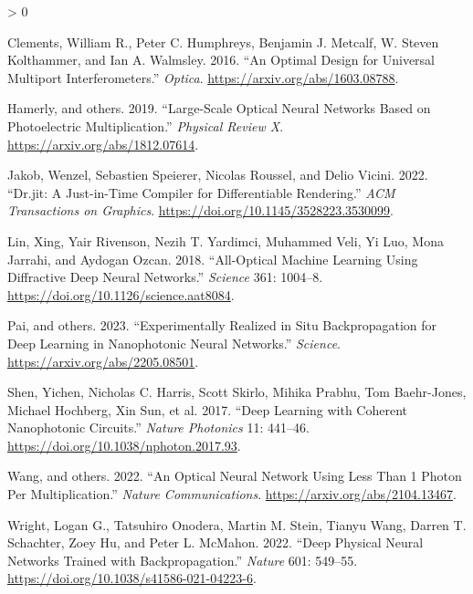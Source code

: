 \documentclass[
  10pt,
]{article}
\newlength{\cslhangindent}
\newenvironment{CSLReferences}[2] %
 {%
  \setlength{\parindent}{0pt}
  \ifodd #1 \everypar{\setlength{\hangindent}{\cslhangindent}}\ignorespaces\fi
  \ifnum #2 > 0
  \setlength{\parskip}{#2\baselineskip}
  \fi
 }%
 {}
\begin{document}
\hypertarget{refs}{}
\begin{CSLReferences}{1}{0}
\leavevmode{}%
Clements, William R., Peter C. Humphreys, Benjamin J. Metcalf, W. Steven
Kolthammer, and Ian A. Walmsley. 2016. {``An Optimal Design for
Universal Multiport Interferometers.''} \emph{Optica}.
\url{https://arxiv.org/abs/1603.08788}.

\leavevmode{}%
Hamerly, and others. 2019. {``Large-Scale Optical Neural Networks Based
on Photoelectric Multiplication.''} \emph{Physical Review X}.
\url{https://arxiv.org/abs/1812.07614}.

\leavevmode{}%
Jakob, Wenzel, Sebastien Speierer, Nicolas Roussel, and Delio Vicini.
2022. {``Dr.jit: A Just-in-Time Compiler for Differentiable
Rendering.''} \emph{ACM Transactions on Graphics}.
\url{https://doi.org/10.1145/3528223.3530099}.

\leavevmode{}%
Lin, Xing, Yair Rivenson, Nezih T. Yardimci, Muhammed Veli, Yi Luo, Mona
Jarrahi, and Aydogan Ozcan. 2018. {``All-Optical Machine Learning Using
Diffractive Deep Neural Networks.''} \emph{Science} 361: 1004--8.
\url{https://doi.org/10.1126/science.aat8084}.

\leavevmode{}%
Pai, and others. 2023. {``Experimentally Realized in Situ
Backpropagation for Deep Learning in Nanophotonic Neural Networks.''}
\emph{Science}. \url{https://arxiv.org/abs/2205.08501}.

\leavevmode{}%
Shen, Yichen, Nicholas C. Harris, Scott Skirlo, Mihika Prabhu, Tom
Baehr-Jones, Michael Hochberg, Xin Sun, et al. 2017. {``Deep Learning
with Coherent Nanophotonic Circuits.''} \emph{Nature Photonics} 11:
441--46. \url{https://doi.org/10.1038/nphoton.2017.93}.

\leavevmode{}%
Wang, and others. 2022. {``An Optical Neural Network Using Less Than 1
Photon Per Multiplication.''} \emph{Nature Communications}.
\url{https://arxiv.org/abs/2104.13467}.

\leavevmode{}%
Wright, Logan G., Tatsuhiro Onodera, Martin M. Stein, Tianyu Wang,
Darren T. Schachter, Zoey Hu, and Peter L. McMahon. 2022. {``Deep
Physical Neural Networks Trained with Backpropagation.''} \emph{Nature}
601: 549--55. \url{https://doi.org/10.1038/s41586-021-04223-6}.

\end{CSLReferences}
\end{document}
